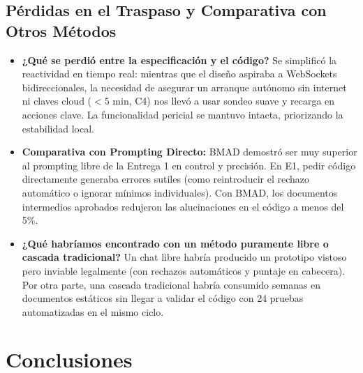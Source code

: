 \documentclass[11pt,letterpaper]{article}
\begin{document}
\subsection{Pérdidas en el Traspaso y Comparativa con Otros Métodos}
\begin{itemize}
    \item \textbf{¿Qué se perdió entre la especificación y el código?} Se simplificó la reactividad en tiempo real: mientras que el diseño aspiraba a WebSockets bidireccionales, la necesidad de asegurar un arranque autónomo sin internet ni claves cloud ($<5$ min, C4) nos llevó a usar sondeo suave y recarga en acciones clave. La funcionalidad pericial se mantuvo intacta, priorizando la estabilidad local.
    \item \textbf{Comparativa con Prompting Directo:} BMAD demostró ser muy superior al prompting libre de la Entrega 1 en control y precisión. En E1, pedir código directamente generaba errores sutiles (como reintroducir el rechazo automático o ignorar mínimos individuales). Con BMAD, los documentos intermedios aprobados redujeron las alucinaciones en el código a menos del 5\%.
    \item \textbf{¿Qué habríamos encontrado con un método puramente libre o cascada tradicional?} Un chat libre habría producido un prototipo vistoso pero inviable legalmente (con rechazos automáticos y puntaje en cabecera). Por otra parte, una cascada tradicional habría consumido semanas en documentos estáticos sin llegar a validar el código con 24 pruebas automatizadas en el mismo ciclo.
\end{itemize}

\newpage

\section{Conclusiones}
\end{document}
